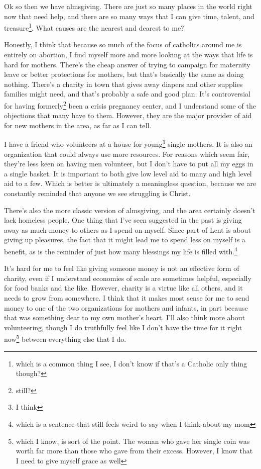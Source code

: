 \documentclass[12pt]{article}[titlepage]
\renewcommand{\,}{\textsuperscript{,}}
\begin{document}
Ok so then we have almsgiving.  
There are just so many places in the world right now that need help, and there are so many ways that I can give time, talent, and treasure\footnote{which is a common thing I see, I don't know if that's a Catholic only thing though?}.  
What causes are the nearest and dearest to me?

Honestly, I think that because so much of the focus of catholics around me is entirely on abortion, I find myself more and more looking at the ways that life is hard for mothers.  
There's the cheap answer of trying to campaign for maternity leave or better protections for mothers, but that's basically the same as doing nothing.  
There's a charity in town that gives away diapers and other supplies families might need, and that's probably a safe and good plan.  
It's controversial for having formerly\footnote{still?} been a crisis pregnancy center, and I understand some of the objections that many have to them.  
However, they are the major provider of aid for new mothers in the area, as far as I can tell.

I have a friend who volunteers at a house for young\footnote{I think} single mothers.  
It is also an organization that could always use more resources.  
For reasons which seem fair, they're less keen on having men volunteer, but I don't have to put all my eggs in a single basket.  
It is important to both give low level aid to many and high level aid to a few.  
Which is better is ultimately a meaningless question, because we are constantly reminded that anyone we see struggling is Christ.

There's also the more classic version of almsgiving, and the area certainly doesn't lack homeless people.  
One thing that I've seen suggested in the past is giving away as much money to others as I spend on myself.  
Since part of Lent is about giving up pleasures, the fact that it might lead me to spend less on myself is a benefit, as is the reminder of just how many blessings my life is filled with.\footnote{which is a sentence that still feels weird to say when I think about my mom}

It's hard for me to feel like giving someone money is not an effective form of charity, even if I understand economies of scale are sometimes helpful, especially for food banks and the like.  
However, charity is a virtue like all others, and it needs to grow from somewhere.  
I think that it makes most sense for me to send money to one of the two organizations for mothers and infants, in part because that was something dear to my own mother's heart.  
I'll also think more about volunteering, though I do truthfully feel like I don't have the time for it right now\footnote{which I know, is sort of the point. The woman who gave her single coin was worth far more than those who gave from their excess. However, I know that I need to give myself grace as well} between everything else that I do.
\end{document}
